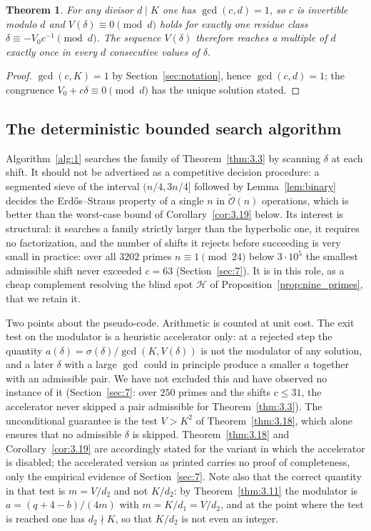 \documentclass[11pt, a4paper]{article}
\theoremstyle{plain}
\newtheorem{theorem}{Theorem}[section]
\theoremstyle{definition}
\begin{document}
\begin{theorem} \label{thm:3.17}
For any divisor $d \mid K$ one has $\gcd(c,d)=1$, so $c$ is invertible modulo $d$ and $V(\delta)\equiv0\pmod d$ holds for exactly one residue class $\delta \equiv -V_0 c^{-1} \pmod{d}$. The sequence $V(\delta)$ therefore reaches a multiple of $d$ exactly once in every $d$ consecutive values of $\delta$.
\end{theorem}
\begin{proof}
$\gcd(c,K)=1$ by Section~\ref{sec:notation}, hence $\gcd(c,d)=1$; the congruence $V_0+c\delta\equiv0\pmod d$ has the unique solution stated.
\end{proof}

\subsection{The deterministic bounded search algorithm} \label{sec:3.8}

Algorithm~\ref{alg:1} searches the family of Theorem~\ref{thm:3.3} by scanning $\delta$ at each shift. It should not be advertised as a competitive decision procedure: a segmented sieve of the interval $(n/4,3n/4]$ followed by Lemma~\ref{lem:binary} decides the Erd\H{o}s--Straus property of a single $n$ in $\tilde{\mathcal{O}}(n)$ operations, which is better than the worst-case bound of Corollary~\ref{cor:3.19} below. Its interest is structural: it searches a family strictly larger than the hyperbolic one, it requires no factorization, and the number of shifts it rejects before succeeding is very small in practice: over all $3202$ primes $n\equiv1\pmod{24}$ below $3\cdot10^{5}$ the smallest admissible shift never exceeded $c=63$ (Section~\ref{sec:7}). It is in this role, as a cheap complement resolving the blind spot $\mathcal{H}$ of Proposition~\ref{prop:nine_primes}, that we retain it.

Two points about the pseudo-code. Arithmetic is counted at unit cost. The exit test on the modulator is a heuristic accelerator only: at a rejected step the quantity $a(\delta)=\sigma(\delta)/\gcd(K,V(\delta))$ is not the modulator of any solution, and a later $\delta$ with a large $\gcd$ could in principle produce a smaller $a$ together with an admissible pair. We have not excluded this and have observed no instance of it (Section~\ref{sec:7}: over $250$ primes and the shifts $c\le31$, the accelerator never skipped a pair admissible for Theorem~\ref{thm:3.3}). The unconditional guarantee is the test $V>K^{2}$ of Theorem~\ref{thm:3.18}, which alone ensures that no admissible $\delta$ is skipped. Theorem~\ref{thm:3.18} and Corollary~\ref{cor:3.19} are accordingly stated for the variant in which the accelerator is disabled; the accelerated version as printed carries no proof of completeness, only the empirical evidence of Section~\ref{sec:7}. Note also that the correct quantity in that test is $m=V/d_2$ and not $K/d_2$: by Theorem~\ref{thm:3.11} the modulator is $a=(q+4-b)/(4m)$ with $m=K/d_1=V/d_2$, and at the point where the test is reached one has $d_2\nmid K$, so that $K/d_2$ is not even an integer.
\end{document}
